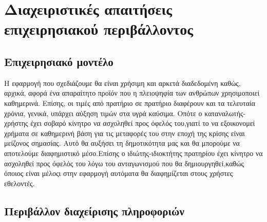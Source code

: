 \section{Διαχειριστικές απαιτήσεις επιχειρησιακού περιβάλλοντος}

\subsection{Επιχειρησιακό μοντέλο}
Η εφαρμογή που σχεδιάζουμε θα είναι χρήσιμη και αρκετά διαδεδομένη καθώς, αρχικά, αφορά ένα απαραίτητο προϊόν που η πλειοψηφία των ανθρώπων χρησιμοποιεί καθημερινά. Επίσης, οι τιμές από πρατήριο σε πρατήριο διαφέρουν και τα τελευταία χρόνια, γενικά, υπάρχει αύξηση τιμών στα υγρά καύσιμα. Οπότε ο καταναλωτής-χρήστης έχει σοβαρό κίνητρο να ασχοληθεί προς όφελός του,γιατί το να εξοικονομεί χρήματα σε καθημερινή βάση για τις μεταφορές του στην εποχή της κρίσης είναι μείζονος σημασίας. Αυτό θα αυξήσει τη δημοτικότητα μας και  θα μπορούμε να αποτελούμε διαφημιστικό μέσο.Επίσης ο ιδιώτης-ιδιοκτήτης πρατηρίου έχει κίνητρο να ασχοληθεί προς όφελός του λόγω του ανταγωνισμού που θα δημιουργηθεί,καθώς όποιος είναι μέλοςι στην εφαρμογή αυτόματα θα διαφημίζεται στους χρήστες εθελοντές.


\subsection{Περιβάλλον διαχείρισης πληροφοριών}



